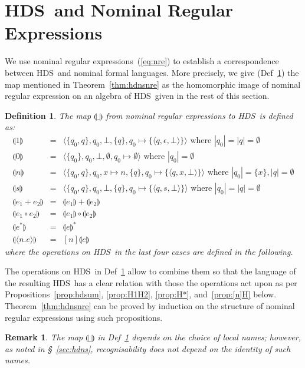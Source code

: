 \documentclass[runningheads,a4paper]{llncs}
\newcommand{\nretohds}[1]{\llparenthesis #1 \rrparenthesis}
\newcommand{\emptystr}{\epsilon}
\newcommand{\weight}[1]{|#1|}
\newcommand{\hdns}{HDS}
\newtheorem{definition}{Theorem}[section]
\newtheorem{remark}{Theorem}[section]
\newtheorem{definition}{Definition}[section]
\newtheorem{remark}{Remark}[section]
\newcommand{\tuple}[1]{\langle#1\rangle}
\newcommand{\hdtr}[3]{\tuple{#2,#1,#3}}
\begin{document}
\section{\hdns\ and Nominal Regular Expressions}\label{sec:hsnre}
We use nominal regular expressions~(\ref{eq:nre}) to establish a
correspondence between \hdns\ and nominal formal languages.
More precisely, we give (Def~\ref{def:nretohdns}) the map mentioned in
Theorem~\ref{thm:hdnsnre} as the homomorphic image of nominal regular
expression on an algebra of \hdns\ given in the rest of this section.
\begin{definition}\label{def:nretohdns}
   The map $\nretohds{\_}$ from nominal regular expressions to \hdns\
  is defined as:
  \begin{eqnarray*}
  \nretohds 1 & = &
    \tuple{\{q_0,q\},q_0,\bot,\{q\},q_0 \mapsto \{\hdtr \emptystr q \bot \}}
    \text{ where } \weight{q_0} = \weight q = \emptyset
    \\
    \nretohds 0 & = &
    \tuple{\{q_0\},q_0,\bot,\emptyset,q_0 \mapsto \emptyset}
    \text{ where } \weight{q_0} = \emptyset
    \\
    \nretohds n & = &
    \tuple{\{q_0,q\},q_0,x\mapsto n,\{q\},q_0 \mapsto \{ \hdtr x q \bot \}}
    \text{ where } \weight{q_0} = \{x\}, \weight q = \emptyset
    \\
    \nretohds s & = &
    \tuple{\{q_0,q\},q_0,\bot,\{q\},q_0 \mapsto \{ \hdtr s q \bot \}}
    \text{ where } \weight{q_0} = \weight q = \emptyset
    \\
    \nretohds{e_1 + e_2} & = &
    \nretohds{e_1} + \nretohds{e_2}
    \\
    \nretohds{e_1 \circ e_2} & = &
    \nretohds{e_1} \circ \nretohds{e_2}  
    \\
    \nretohds{e^\ast} & = &
    \nretohds{e}^\ast
    \\
    \nretohds{\tuple{n.e}} & = &
    [n] \nretohds{e}
  \end{eqnarray*}
  where the operations on \hdns\ in the last four cases are defined in
  the following.
\end{definition}
The operations on \hdns\ in Def~\ref{def:nretohdns} allow to combine
them so that the language of the resulting \hdns\ has a clear relation
with those the operations act upon as per
Propositions~\ref{prop:hdsum}, \ref{prop:H1H2}, \ref{prop:H*},
and~\ref{prop:[n]H} below.
Theorem~\ref{thm:hdnsnre} can be proved by induction on the structure
of nominal regular expressions using such propositions.
\begin{remark}\label{rmk:nretohdns}
  The map $\nretohds{\_}$ in Def~\ref{def:nretohdns} depends
  on the choice of local names; however, as noted in
  \S~\ref{sec:hdns}, recognisability does not depend on the identity
  of such names.
\end{remark}
\end{document}
